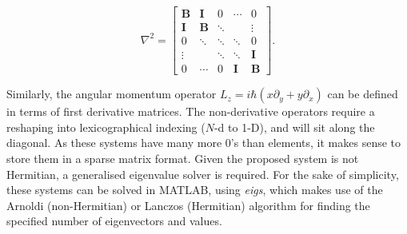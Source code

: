 \begin{equation}
    \nabla^2=
    \begin{bmatrix}
        \mathbf{B}    & \mathbf{I} &      0      &  \cdots      &      0       \\
        \mathbf{I}    & \mathbf{B} &  \ddots     &              &  \vdots      \\
        0             & \ddots     &  \ddots     &  \ddots      &      0       \\
        \vdots        &            &  \ddots     &  \ddots      &  \mathbf{I}  \\
        0             & \cdots     &      0      &  \mathbf{I}  &  \mathbf{B}
    \end{bmatrix}.
\end{equation}

Similarly, the angular momentum operator $L_z = i\hbar(x\partial_y + y\partial_x)$ can be defined in terms of first derivative matrices. The non-derivative operators require a reshaping into lexicographical indexing ($N$-d to 1-D), and will sit along the diagonal. As these systems have many more 0's than elements, it makes sense to store them in a sparse matrix format. Given the proposed system is not Hermitian, a generalised eigenvalue solver is required. For the sake of simplicity, these systems can be solved in MATLAB, using \textit{eigs}, which makes use of the Arnoldi (non-Hermitian) or Lanczos (Hermitian) algorithm for finding the specified number of eigenvectors and values.
